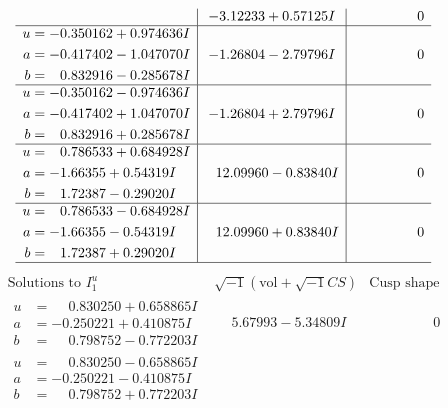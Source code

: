 \documentclass[1p]{elsarticle_modified}
\theoremstyle{definition}
\newcommand{\I}{\sqrt{-1}}
\begin{document}
$$\begin{array}{c|c|c}
 & -3.12233 + 0.57125 I & \phantom{-0.000000 } 0 \\ \hline\begin{aligned}
u &= -0.350162 + 0.974636 I \\
a &= -0.417402 - 1.047070 I \\
b &= \phantom{-}0.832916 - 0.285678 I\end{aligned}
 & -1.26804 - 2.79796 I & \phantom{-0.000000 } 0 \\ \hline\begin{aligned}
u &= -0.350162 - 0.974636 I \\
a &= -0.417402 + 1.047070 I \\
b &= \phantom{-}0.832916 + 0.285678 I\end{aligned}
 & -1.26804 + 2.79796 I & \phantom{-0.000000 } 0 \\ \hline\begin{aligned}
u &= \phantom{-}0.786533 + 0.684928 I \\
a &= -1.66355 + 0.54319 I \\
b &= \phantom{-}1.72387 - 0.29020 I\end{aligned}
 & \phantom{-}12.09960 - 0.83840 I & \phantom{-0.000000 } 0 \\ \hline\begin{aligned}
u &= \phantom{-}0.786533 - 0.684928 I \\
a &= -1.66355 - 0.54319 I \\
b &= \phantom{-}1.72387 + 0.29020 I\end{aligned}
 & \phantom{-}12.09960 + 0.83840 I & \phantom{-0.000000 } 0\\
 \hline 
 \end{array}$$\newpage$$\begin{array}{c|c|c}  
\text{Solutions to }I^u_{1}& \I (\text{vol} + \sqrt{-1}CS) & \text{Cusp shape}\\
 \hline 
\begin{aligned}
u &= \phantom{-}0.830250 + 0.658865 I \\
a &= -0.250221 + 0.410875 I \\
b &= \phantom{-}0.798752 - 0.772203 I\end{aligned}
 & \phantom{-}5.67993 - 5.34809 I & \phantom{-0.000000 } 0 \\ \hline\begin{aligned}
u &= \phantom{-}0.830250 - 0.658865 I \\
a &= -0.250221 - 0.410875 I \\
b &= \phantom{-}0.798752 + 0.772203 I\end{aligned}

\end{array}$$
\end{document}

